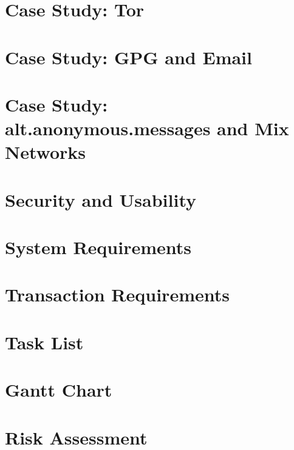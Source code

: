 \chapter{Case Study: Tor}


\chapter{Case Study: GPG and Email}


\chapter{Case Study: alt.anonymous.messages and Mix Networks}


\chapter{Security and Usability}


\chapter{System Requirements}


\chapter{Transaction Requirements}


\chapter{Task List}


\chapter{Gantt Chart}


\chapter{Risk Assessment}

